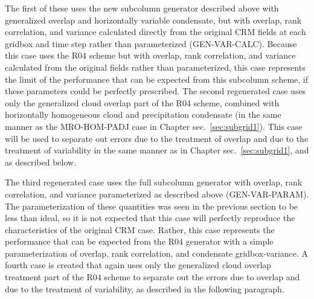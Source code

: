 The first of these uses the new subcolumn generator described above with
generalized overlap and horizontally variable condensate, but with
overlap, rank correlation, and variance calculated directly from the
original CRM fields at each gridbox and time step rather than
parameterized (GEN-VAR-CALC). Because this case uses the R04 scheme but
with overlap, rank correlation, and variance calculated from the
original fields rather than parameterized, this case represents the
limit of the performance that can be expected from this subcolumn
scheme, if these parameters could be perfectly prescribed. The second
regenerated case uses only the generalized cloud overlap part of the R04
scheme, combined with horizontally homogeneous cloud and precipitation
condensate (in the same manner as the MRO-HOM-PADJ case in Chapter
sec.~\ref{sec:subgrid1}). This case will be used to separate out errors
due to the treatment of overlap and due to the treatment of variability
in the same manner as in Chapter sec.~\ref{sec:subgrid1}, and as
described below.

The third regenerated case uses the full subcolumn generator with
overlap, rank correlation, and variance parameterized as described above
(GEN-VAR-PARAM). The parameterization of these quantities was seen in
the previous section to be less than ideal, so it is not expected that
this case will perfectly reproduce the characteristics of the original
CRM case. Rather, this case represents the performance that can be
expected from the R04 generator with a simple parameterization of
overlap, rank correlation, and condensate gridbox-variance. A fourth
case is created that again uses only the generalized cloud overlap
treatment part of the R04 scheme to separate out the errors due to
overlap and due to the treatment of variability, as described in the
following paragraph.

